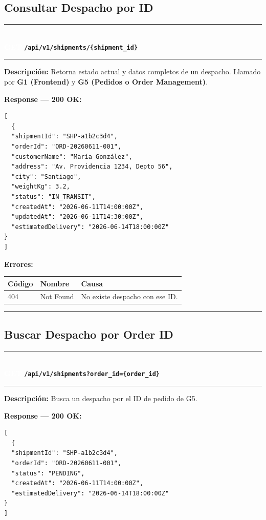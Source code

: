\documentclass[11pt, a4paper]{article}
\newcommand{\httpmethod}[2]{%
  \colorbox{#1}{\textcolor{white}{\textbf{\small\textsf{#2}}}}%
}
\newcommand{\routeheader}[3]{%
  \noindent\rule{\textwidth}{1.5pt}\\[0.3em]
  \httpmethod{#1}{#2}\;\texttt{\bfseries #3}\\[0.3em]
  \rule{\textwidth}{0.4pt}
  \vspace{0.3cm}
}
\begin{document}
\subsection{Consultar Despacho por ID}

\routeheader{get}{GET}{/api/v1/shipments/\{shipment\_id\}}

\textbf{Descripción:} Retorna estado actual y datos completos de un despacho.
Llamado por \textbf{G1 (Frontend)} y \textbf{G5 (Pedidos o Order Management)}.

\vspace{0.3cm}
\textbf{Response --- 200 OK:}

\begin{lstlisting}
[
  {
  "shipmentId": "SHP-a1b2c3d4",
  "orderId": "ORD-20260611-001",
  "customerName": "María González",
  "address": "Av. Providencia 1234, Depto 56",
  "city": "Santiago",
  "weightKg": 3.2,
  "status": "IN_TRANSIT",
  "createdAt": "2026-06-11T14:00:00Z",
  "updatedAt": "2026-06-11T14:30:00Z",
  "estimatedDelivery": "2026-06-14T18:00:00Z"
}
]
\end{lstlisting}

\textbf{Errores:}
\begin{table}[h!]
\small
\begin{tabularx}{\textwidth}{l l X}
  \toprule
  \textbf{Código} & \textbf{Nombre} & \textbf{Causa} \\
  \midrule
  404 & Not Found & No existe despacho con ese ID. \\
  \bottomrule
\end{tabularx}
\end{table}

\noindent\rule{\textwidth}{0.4pt}

\subsection{Buscar Despacho por Order ID}

\routeheader{get}{GET}{/api/v1/shipments?order\_id=\{order\_id\}}

\textbf{Descripción:} Busca un despacho por el ID de pedido de G5.

\vspace{0.3cm}
\textbf{Response --- 200 OK:}

\begin{lstlisting}
[
  {
  "shipmentId": "SHP-a1b2c3d4",
  "orderId": "ORD-20260611-001",
  "status": "PENDING",
  "createdAt": "2026-06-11T14:00:00Z",
  "estimatedDelivery": "2026-06-14T18:00:00Z"
}
]
\end{lstlisting}
\end{document}
